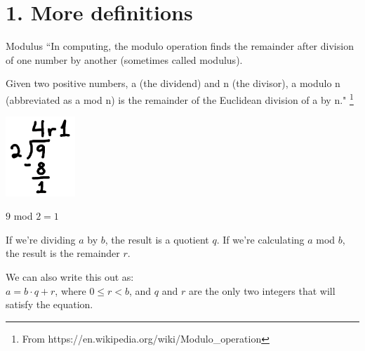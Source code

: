 
\newcommand{\laClass}       {CS 210}
\newcommand{\laSemester}    {Spring 2018}
\newcommand{\laChapter}     {2.2}
\newcommand{\laType}        {Exercise}
\newcommand{\laPoints}      {5}
\newcommand{\laTitle}       {Proofs About Numbers}
\newcommand{\laDate}        {}
\setcounter{chapter}{2}
\setcounter{section}{2}
\addtocounter{section}{-1}

\toggletrue{answerkey}
\togglefalse{answerkey}





    \section*{1. More definitions}

        \begin{intro}{Modulus}
            ``In computing, the modulo operation finds the remainder after
            division of one number by another (sometimes called modulus).

            Given two positive numbers, a (the dividend) and n (the divisor),
            a modulo n (abbreviated as a mod n) is the remainder of the Euclidean division of a by n."
            \footnote{From https://en.wikipedia.org/wiki/Modulo\_operation}

            \begin{center}
                \includegraphics[height=3cm]{images/ch2-1-division.png}

                $9$ mod $2 = 1$
            \end{center}

            If we're dividing $a$ by $b$, the result is a quotient $q$.
            If we're calculating $a$ mod $b$, the result is the remainder $r$.

            \begin{center}
                We can also write this out as: \\
                $ a = b \cdot q + r $,
                where $0 \leq r < b$, and $q$ and $r$ are the only two integers
                that will satisfy the equation.
            \end{center}
        \end{intro}

